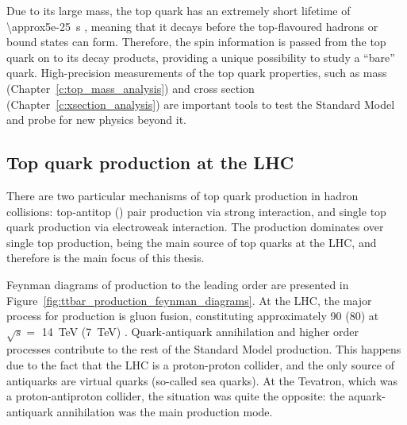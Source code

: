 Due to its large mass, the top quark has an extremely short lifetime of \SI{\approx5e-25}{\s} \autocite{PDG}, meaning
that it decays before the top-flavoured hadrons or \ttbar bound states can form. Therefore, the spin information is
passed from the top quark on to its decay products, providing a unique possibility to study a ``bare'' quark.
High-precision measurements of the top quark properties, such as mass (Chapter~\ref{c:top_mass_analysis}) and cross
section (Chapter~\ref{c:xsection_analysis}) are important tools to test the Standard Model and probe for new physics
beyond it.

\subsection{Top quark production at the LHC}
\label{ss:top_production}
There are two particular mechanisms of top quark production in hadron collisions: top-antitop (\ttbar) pair production
via strong interaction, and single top quark production via electroweak interaction. The \ttbar production dominates
over single top production, being the main source of top quarks at the LHC, and therefore is the main focus of this
thesis.

Feynman diagrams of \ttbar production to the leading order are presented in
Figure~\ref{fig:ttbar_production_feynman_diagrams}. At the LHC, the major process for \ttbar production is gluon fusion,
constituting approximately \SI{90}{\pc} (\SI{80}{\pc}) at $\sqrt s =$ \SI{14}{\TeV} (\SI{7}{\TeV}) \autocite{PDG}.
Quark-antiquark annihilation and higher order processes contribute to the rest of the Standard Model \ttbar production.
This happens due to the fact that the LHC is a proton-proton collider, and the only source of antiquarks are virtual
quarks (so-called sea quarks). At the Tevatron, which was a proton-antiproton collider, the situation was quite the
opposite: the aquark-antiquark annihilation was the main \ttbar production mode.



